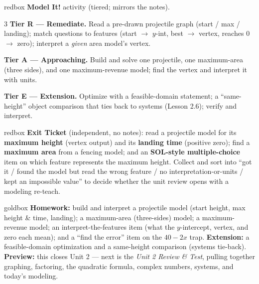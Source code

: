 \documentclass[10pt]{article}
\begin{document}
\begin{skillbox}{redbox}
\textbf{Model It!} activity (tiered; mirrors the notes).
\begin{multicols}{3}
\textbf{Tier R --- Remediate.} Read a pre-drawn projectile graph (start / max / landing); match questions to features
(start $\to$ $y$-int, best $\to$ vertex, reaches $0$ $\to$ zero); interpret a \emph{given} area model's vertex.

\columnbreak
\textbf{Tier A --- Approaching.} Build and solve one projectile, one maximum-area (three sides), and one
maximum-revenue model; find the vertex and interpret it with units.

\columnbreak
\textbf{Tier E --- Extension.} Optimize with a feasible-domain statement; a ``same-height'' object comparison that
ties back to systems (Lesson 2.6); verify and interpret.
\end{multicols}
\end{skillbox}

\begin{skillbox}{redbox}
\textbf{Exit Ticket} (independent, no notes): read a projectile model for its \textbf{maximum height} (vertex output)
and its \textbf{landing time} (positive zero); find a \textbf{maximum area} from a fencing model; and an
\textbf{SOL-style multiple-choice} item on which feature represents the maximum height. Collect and sort into ``got
it / found the model but read the wrong feature / no interpretation-or-units / kept an impossible value'' to decide
whether the unit review opens with a modeling re-teach.
\end{skillbox}

\begin{skillbox}{goldbox}
\textbf{Homework:} build and interpret a projectile model (start height, max height \& time, landing); a
maximum-area (three-sides) model; a maximum-revenue model; an interpret-the-features item (what the $y$-intercept,
vertex, and zero each mean); and a ``find the error'' item on the $40-2x$ trap. \textbf{Extension:} a feasible-domain
optimization and a same-height comparison (systems tie-back). \textbf{Preview:} this closes Unit 2 --- next is the
\emph{Unit 2 Review \& Test}, pulling together graphing, factoring, the quadratic formula, complex numbers, systems,
and today's modeling.
\end{skillbox}
\end{document}
